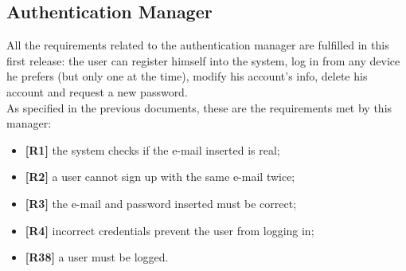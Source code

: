 \subsection{Authentication Manager}
All the requirements related to the authentication manager are fulfilled in this first release: the user can register himself into the system, log in from any device he prefers (but only one at the time), modify his account's info, delete his account and request a new password. \\
As specified in the previous documents, these are the requirements met by this manager:
\begin{itemize}
	\item \textbf{[R1]} the system checks if the e-mail inserted is real;
	\item \textbf{[R2]} a user cannot sign up with the same e-mail twice;
	\item \textbf{[R3]} the e-mail and password inserted must be correct;
	\item \textbf{[R4]} incorrect credentials prevent the user from logging in;
	\item \textbf{[R38]} a user must be logged.
\end{itemize}

